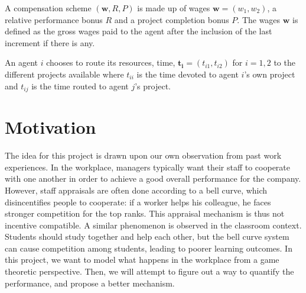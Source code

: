 \documentclass[10pt, a4paper]{article}
\begin{document}
	
	
	A compensation scheme $(\mathbf{w}, R, P)$ is made up of wages $\mathbf{w}=(w_1,w_2)$, a relative performance bonus $R$ and a project completion bonus $P$. The wages $\mathbf{w}$ is defined as the gross wages paid to the agent after the inclusion of the last increment if there is any. 
	
	
	An agent $i$ chooses to route its resources, time, $\mathbf{t_i}=(t_{i1},t_{i2})$ for $i=1,2$ to the different projects available where $t_{ii}$ is the time devoted to agent $i$'s own project and $t_{ij}$ is the time routed to agent $j$'s project.
	
	
	\cite{Chakravarti2015}
	\cite{Drago1991}
	
	\section{Motivation}
	The idea for this project is drawn upon our own observation from past work experiences. In the workplace, managers typically want their staff to cooperate with one another in order to achieve a good overall performance for the company. However, staff appraisals are often done according to a bell curve, which disincentifies people to cooperate: if a worker helps his colleague, he faces stronger competition for the top ranks. This appraisal mechanism is thus not incentive compatible. A similar phenomenon is observed in the classroom context. Students should study together and help each other, but the bell curve system can cause competition among students, leading to poorer learning outcomes. In this project, we want to model what happens in the workplace from a game theoretic perspective. Then, we will attempt to figure out a way to quantify the performance, and propose a better mechanism. 
	
\end{document}
